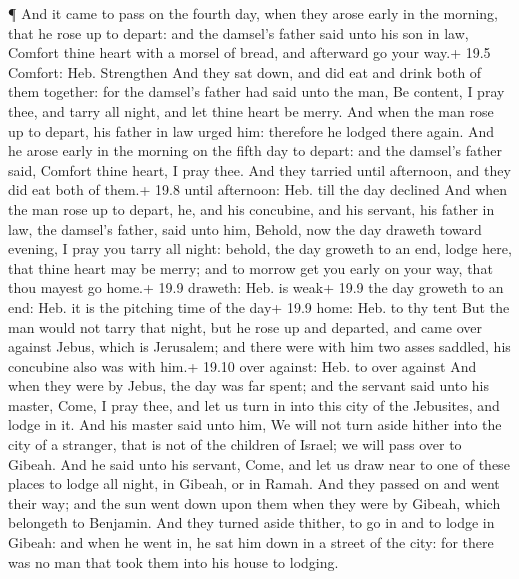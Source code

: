  ¶ And it came to pass on the fourth day, when they arose
early in the morning, that he rose up to depart: and the damsel's father
said unto his son in law, Comfort thine heart with a morsel of bread,
and afterward go your way.+ 19.5 Comfort: Heb. Strengthen 
And they sat down, and did eat and drink both of them together: for the
damsel's father had said unto the man, Be content, I pray thee, and
tarry all night, and let thine heart be merry.  And when the
man rose up to depart, his father in law urged him: therefore he lodged
there again.  And he arose early in the morning on the fifth
day to depart: and the damsel's father said, Comfort thine heart, I pray
thee. And they tarried until afternoon, and they did eat both of them.+
19.8 until afternoon: Heb. till the day declined  And when
the man rose up to depart, he, and his concubine, and his servant, his
father in law, the damsel's father, said unto him, Behold, now the day
draweth toward evening, I pray you tarry all night: behold, the day
groweth to an end, lodge here, that thine heart may be merry; and to
morrow get you early on your way, that thou mayest go home.+ 19.9
draweth: Heb. is weak+ 19.9 the day groweth to an end: Heb. it is the
pitching time of the day+ 19.9 home: Heb. to thy tent  But
the man would not tarry that night, but he rose up and departed, and
came over against Jebus, which is Jerusalem; and there were with him two
asses saddled, his concubine also was with him.+ 19.10 over against:
Heb. to over against  And when they were by Jebus, the day
was far spent; and the servant said unto his master, Come, I pray thee,
and let us turn in into this city of the Jebusites, and lodge in it.
 And his master said unto him, We will not turn aside
hither into the city of a stranger, that is not of the children of
Israel; we will pass over to Gibeah.  And he said unto his
servant, Come, and let us draw near to one of these places to lodge all
night, in Gibeah, or in Ramah.  And they passed on and went
their way; and the sun went down upon them when they were by Gibeah,
which belongeth to Benjamin.  And they turned aside
thither, to go in and to lodge in Gibeah: and when he went in, he sat
him down in a street of the city: for there was no man that took them
into his house to lodging.

